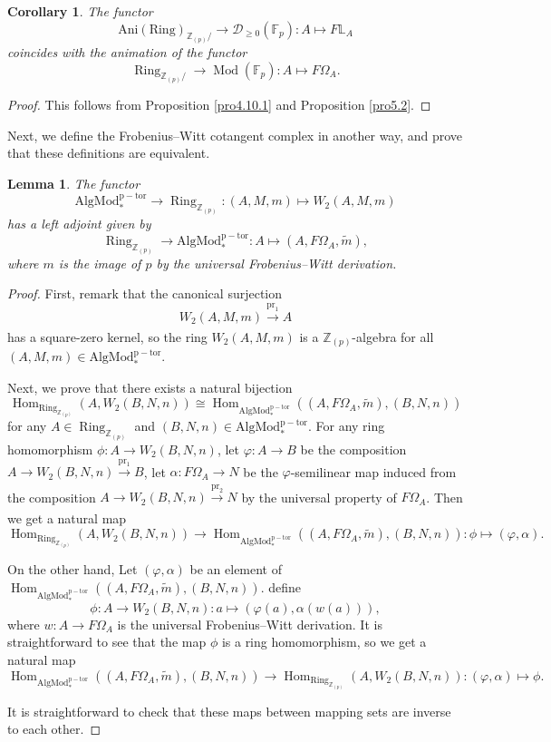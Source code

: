 \documentclass[11pt, a4paper]{amsart}
\theoremstyle{plain}
\newtheorem{lemma}[theorem]{Lemma}
\newtheorem{coro}[theorem]{Corollary}
\theoremstyle{definition}
\begin{document}
\begin{coro}\label{cor4.11.1}
    The functor \[\operatorname{Ani(Ring)}_{\mathbb Z_{(p)}/}\to \mathcal D_{\ge0}(\mathbb F_p):A\mapsto F\mathbb L_A\] coincides with the animation of the functor \[\operatorname{Ring}_{\mathbb Z_{(p)}/}\to \operatorname{Mod}(\mathbb F_p):A\mapsto F\Omega_A.\]
\end{coro}
\begin{proof}
    This follows from Proposition \ref{pro4.10.1} and Proposition \ref{pro5.2}.
\end{proof}

Next, we define the Frobenius--Witt cotangent complex in another way, and prove that these definitions are equivalent.

\begin{lemma}\label{lem4.9}
   The functor \[\operatorname{AlgMod_*^{p-tor}}\to \operatorname{Ring}_{\mathbb Z_{(p)}}:(A,M,m)\mapsto W_2(A,M,m)\] has a left adjoint given by \[\operatorname{Ring}_{\mathbb Z_{(p)}}\to \operatorname{AlgMod_*^{p-tor}}:A\mapsto (A,F\Omega_A,\widetilde m),\] where $m$ is the image of $p$ by the universal Frobenius--Witt derivation.
\end{lemma}
\begin{proof}
    First, remark that the canonical surjection \[W_2(A,M,m)\xrightarrow[]{\mathrm{pr}_1}A\] has a square-zero kernel, so the ring $W_2(A,M,m)$ is a $\mathbb Z_{(p)}$-algebra for all $(A,M,m)\in \operatorname{AlgMod_*^{p-tor}}$.

    Next, we prove that there exists a natural bijection \[\operatorname{Hom}_{\operatorname{Ring}_{\mathbb Z_{(p)}}}(A,W_2(B,N,n))\cong \operatorname{Hom}_{\operatorname{AlgMod_*^{p-tor}}}((A,F\Omega_A,\widetilde m),(B,N,n))\] for any $A\in \operatorname{Ring}_{\mathbb Z_{(p)}}$ and $(B,N,n)\in \operatorname{AlgMod_*^{p-tor}}$. For any ring homomorphism $\phi:A\to W_2(B,N,n)$, let $\varphi:A\to B$ be the composition $A\to W_2(B,N,n)\xrightarrow[]{\mathrm{pr}_1}B$, let $\alpha:F\Omega_A\to N$ be the $\varphi$-semilinear map induced from the composition $A\to W_2(B,N,n)\xrightarrow[]{\mathrm{pr}_2}N$ by the universal property of $F\Omega_A$. Then we get a natural map\[\operatorname{Hom}_{\operatorname{Ring}_{\mathbb Z_{(p)}}}(A,W_2(B,N,n))\to \operatorname{Hom}_{\operatorname{AlgMod_*^{p-tor}}}((A,F\Omega_A,\widetilde m),(B,N,n)):\phi\mapsto (\varphi,\alpha).\]

    
    On the other hand, Let $(\varphi,\alpha)$ be an element of $\operatorname{Hom}_{\operatorname{AlgMod_*^{p-tor}}}((A,F\Omega_A,\widetilde m),(B,N,n))$. define \[\phi:A\to W_2(B,N,n):a\mapsto (\varphi(a),\alpha (w(a))),\] where $w:A\to F\Omega_A$ is the universal Frobenius--Witt derivation. It is straightforward to see that the map $\phi$ is a ring homomorphism, so we get a natural map \[\operatorname{Hom}_{\operatorname{AlgMod_*^{p-tor}}}((A,F\Omega_A,\widetilde m),(B,N,n))\to \operatorname{Hom}_{\operatorname{Ring}_{\mathbb Z_{(p)}}}(A,W_2(B,N,n)):(\varphi,\alpha)\mapsto \phi.\]

    It is straightforward to check that these maps between mapping sets are inverse to each other.
\end{proof}
\end{document}
